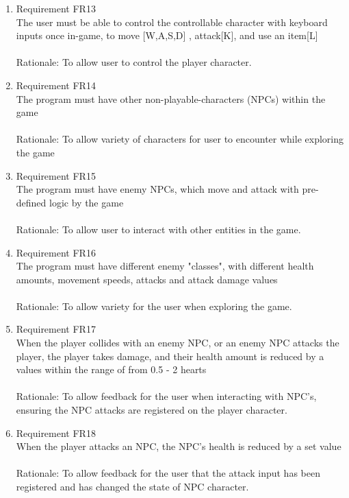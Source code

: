 \documentclass[12pt, titlepage]{article}
\begin{document}
\begin{enumerate}
    \item Requirement FR13\\The user must be able to control the controllable character with keyboard inputs  once in-game, to move [W,A,S,D] , attack[K], and use an item[L]\\\\
    {\color{blue}Rationale: To allow user to control the player character.}
    
    \item Requirement FR14\\The program must have other non-playable-characters (NPCs) within the game\\\\
    {\color{blue}Rationale: To allow variety of characters for user to encounter while exploring the game}
    
    \item Requirement FR15\\The program must have enemy NPCs, which move and attack with pre-defined logic by the game\\\\
    {\color{blue}Rationale: To allow user to interact with other entities in the game.}
    
    \item Requirement FR16\\The program must have different enemy "classes", with different health amounts, movement speeds, attacks and attack damage values\\\\
    {\color{blue}Rationale: To allow variety for the user when exploring the game.}
    
    \item Requirement FR17\\When the player collides with an enemy NPC, or an enemy NPC attacks the player, the player takes damage, and their health amount is reduced by a values within the range of from 0.5 - 2 hearts\\\\
    {\color{blue}Rationale: To allow feedback for the user when interacting with NPC's, ensuring the NPC attacks are registered on the player character.}
    
    \item Requirement FR18\\When the player attacks an NPC, the NPC's health is reduced by a set value\\\\
    {\color{blue}Rationale: To allow feedback for the user that the attack input has been registered and has changed the state of NPC character.}
    

\end{enumerate}
\end{document}
